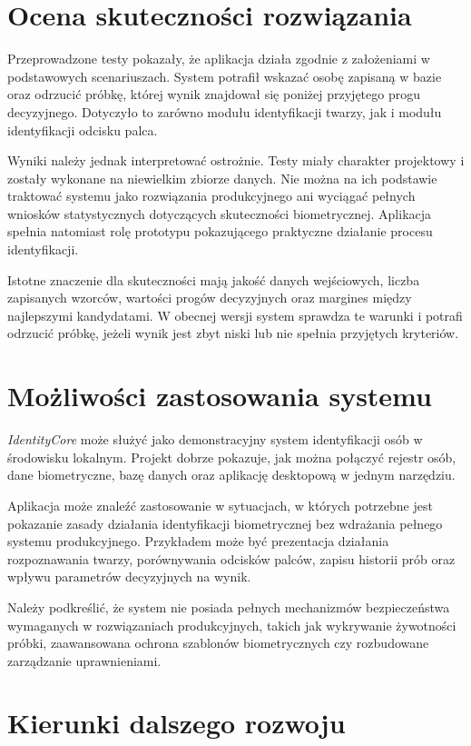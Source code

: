 \section{Ocena skuteczności rozwiązania}

Przeprowadzone testy pokazały, że aplikacja działa zgodnie z założeniami w podstawowych scenariuszach. System potrafił wskazać osobę zapisaną w bazie oraz odrzucić próbkę, której wynik znajdował się poniżej przyjętego progu decyzyjnego. Dotyczyło to zarówno modułu identyfikacji twarzy, jak i modułu identyfikacji odcisku palca.

Wyniki należy jednak interpretować ostrożnie. Testy miały charakter projektowy i zostały wykonane na niewielkim zbiorze danych. Nie można na ich podstawie traktować systemu jako rozwiązania produkcyjnego ani wyciągać pełnych wniosków statystycznych dotyczących skuteczności biometrycznej. Aplikacja spełnia natomiast rolę prototypu pokazującego praktyczne działanie procesu identyfikacji.

Istotne znaczenie dla skuteczności mają jakość danych wejściowych, liczba zapisanych wzorców, wartości progów decyzyjnych oraz margines między najlepszymi kandydatami. W obecnej wersji system sprawdza te warunki i potrafi odrzucić próbkę, jeżeli wynik jest zbyt niski lub nie spełnia przyjętych kryteriów.

\section{Możliwości zastosowania systemu}

\textit{IdentityCore} może służyć jako demonstracyjny system identyfikacji osób w środowisku lokalnym. Projekt dobrze pokazuje, jak można połączyć rejestr osób, dane biometryczne, bazę danych oraz aplikację desktopową w jednym narzędziu. 

Aplikacja może znaleźć zastosowanie w sytuacjach, w których potrzebne jest pokazanie zasady działania identyfikacji biometrycznej bez wdrażania pełnego systemu produkcyjnego. Przykładem może być prezentacja działania rozpoznawania twarzy, porównywania odcisków palców, zapisu historii prób oraz wpływu parametrów decyzyjnych na wynik.

Należy podkreślić, że system nie posiada pełnych mechanizmów bezpieczeństwa wymaganych w rozwiązaniach produkcyjnych, takich jak wykrywanie żywotności próbki, zaawansowana ochrona szablonów biometrycznych czy rozbudowane zarządzanie uprawnieniami.

\section{Kierunki dalszego rozwoju}

